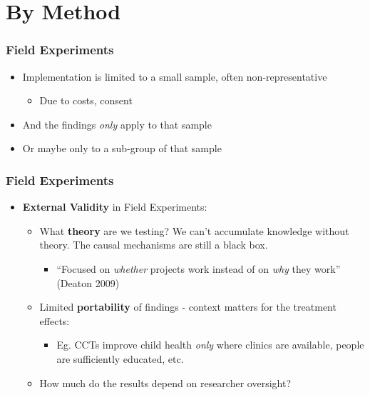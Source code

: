 \documentclass[xcolor=x11names,compress]{beamer}\usepackage[]{graphicx}\usepackage[]{color}
\renewcommand{\(}{\begin{columns}}
\renewcommand{\)}{\end{columns}}
\newcommand{\<}[1]{\begin{column}{#1}}
\renewcommand{\>}{\end{column}}
\begin{document}
\section{By Method}

\begin{frame}
\frametitle{Field Experiments}
\begin{itemize}
\item Implementation is limited to a small sample, often non-representative
\pause
\begin{itemize}
\item Due to costs, consent
\pause
\end{itemize}
\item And the findings \textit{only} apply to that sample
\pause
\item Or maybe only to a sub-group of that sample
\end{itemize}
\end{frame}

\begin{frame}
\frametitle{Field Experiments}
\begin{itemize}
\item \textbf{External Validity} in Field Experiments:
\pause
\begin{itemize}
\item What \textbf{theory} are we testing? We can't accumulate knowledge without theory. The causal mechanisms are still a black box.
\pause
\begin{itemize}
\item ``Focused on \textit{whether} projects work instead of on \textit{why} they work'' (Deaton 2009)
\end{itemize}
\pause
\item Limited \textbf{portability} of findings - context matters for the treatment effects:
\pause
\begin{itemize}
\item Eg. CCTs improve child health \textit{only} where clinics are available, people are sufficiently educated, etc.
\end{itemize}
\pause
\item How much do the results depend on researcher oversight?
\end{itemize}
\end{itemize}
\end{frame}
\end{document}
